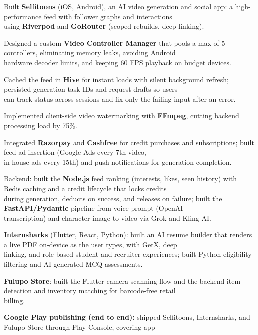 \documentclass[a4paper]{article}
\newcommand{\asitilde}{{\usefont{8r}{phv}{m}{n}\char126}}
\begin{document}
\begin{rbullets}
  \item Built \textbf{Selfitoons} (iOS, Android), an AI video generation and social app: a high-performance feed with follower graphs and interactions\\
    using \textbf{Riverpod} and \textbf{GoRouter} (scoped rebuilds, deep linking).
  \item Designed a custom \textbf{Video Controller Manager} that pools a max of 5 controllers, eliminating memory leaks, avoiding Android\\
    hardware decoder limits, and keeping 60 FPS playback on budget devices.
  \item Cached the feed in \textbf{Hive} for instant loads with silent background refresh; persisted generation task IDs and request drafts so users\\
    can track status across sessions and fix only the failing input after an error.
  \item Implemented client-side video watermarking with \textbf{FFmpeg}, cutting backend processing load by \asitilde 75\%.
  \item Integrated \textbf{Razorpay} and \textbf{Cashfree} for credit purchases and subscriptions; built feed ad insertion (Google Ads every 7th video,\\
    in-house ads every 15th) and push notifications for generation completion.
  \item Backend: built the \textbf{Node.js} feed ranking (interests, likes, seen history) with Redis caching and a credit lifecycle that locks credits\\
    during generation, deducts on success, and releases on failure; built the \textbf{FastAPI/Pydantic} pipeline from voice prompt (OpenAI\\
    transcription) and character image to video via Grok and Kling AI.
  \item \textbf{Internsharks} (Flutter, React, Python): built an AI resume builder that renders a live PDF on-device as the user types, with GetX, deep\\
    linking, and role-based student and recruiter experiences; built Python eligibility filtering and AI-generated MCQ assessments.
  \item \textbf{Fulupo Store}: built the Flutter camera scanning flow and the backend item detection and inventory matching for barcode-free retail\\
    billing.
  \item \textbf{Google Play publishing (end to end):} shipped Selfitoons, Internsharks, and Fulupo Store through Play Console, covering app\\

\end{rbullets}
\end{document}
